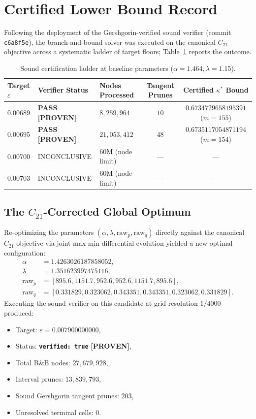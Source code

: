 \documentclass[11pt,a4paper]{article}
\theoremstyle{remark}
\newcommand{\eps}{\varepsilon}
\begin{document}
\section{Certified Lower Bound Record}

Following the deployment of the Gershgorin-verified sound verifier (commit \texttt{c6a8f5e}), the branch-and-bound solver was executed on the canonical $C_{21}$ objective across a systematic ladder of target floors; Table~\ref{tab:sound_ladder} reports the outcome.

\begin{table}[ht]
\centering
\small
\begin{tabular}{lllcc}
\toprule
Target $\eps$ & Verifier Status & Nodes Processed & Tangent Prunes & Certified $\kappa^*$ Bound \\
\midrule
$0.00689$ & \textbf{PASS [PROVEN]} & $8{,}259{,}964$ & $10$ & $0.6734729658195391$ ($m=155$) \\
$0.00695$ & \textbf{PASS [PROVEN]} & $21{,}053{,}412$ & $48$ & $0.6735117054871194$ ($m=154$) \\
$0.00700$ & INCONCLUSIVE & $60\text{M}$ (node limit) & --- & --- \\
$0.00703$ & INCONCLUSIVE & $60\text{M}$ (node limit) & --- & --- \\
\bottomrule
\end{tabular}
\caption{Sound certification ladder at baseline parameters ($\alpha=1.464, \lambda=1.15$).}
\label{tab:sound_ladder}
\end{table}

\subsection{The $C_{21}$-Corrected Global Optimum}
Re-optimizing the parameters $(\alpha, \lambda, \text{raw}_p, \text{raw}_q)$ directly against the canonical $C_{21}$ objective via joint max-min differential evolution yielded a new optimal configuration:
\begin{align*}
 \alpha &= 1.4263026187858052, \\
 \lambda &= 1.351623997475116, \\
 \text{raw}_p &= [895.6, 1151.7, 952.6, 952.6, 1151.7, 895.6], \\
 \text{raw}_q &= [0.331829, 0.323062, 0.343351, 0.343351, 0.323062, 0.331829].
\end{align*}
Executing the sound verifier on this candidate at grid resolution $1/4000$ produced:
\begin{itemize}
\item Target: $\eps = 0.007900000000$,
\item Status: \textbf{\texttt{verified: true}} \textbf{[PROVEN]},
\item Total B\&B nodes: $27{,}679{,}928$,
\item Interval prunes: $13{,}839{,}793$,
\item Sound Gershgorin tangent prunes: $203$,
\item Unresolved terminal cells: $0$.
\end{itemize}
\end{document}
